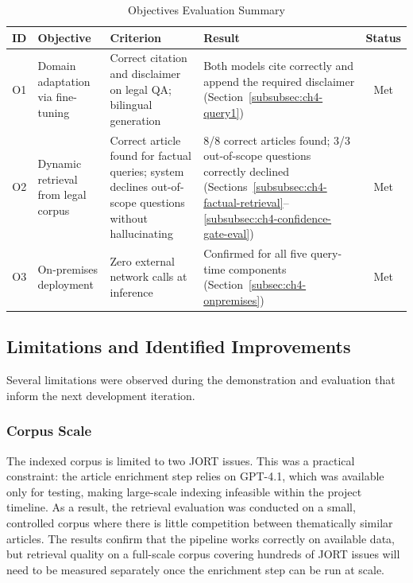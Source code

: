 \begin{table}[H]
\centering
\caption{Objectives Evaluation Summary}
\label{tab:objectives-summary}
\renewcommand{\arraystretch}{1.4}
\begin{tabular}{|c|p{2.8cm}|p{4cm}|p{3.5cm}|c|}
\hline
\textbf{ID} & \textbf{Objective} & \textbf{Criterion} & \textbf{Result} & \textbf{Status} \\
\hline
O1 & Domain adaptation via fine-tuning & Correct citation and disclaimer on legal QA; bilingual generation & Both models cite correctly and append the required disclaimer (Section~\ref{subsubsec:ch4-query1}) & Met \\
\hline
O2 & Dynamic retrieval from legal corpus & Correct article found for factual queries; system declines out-of-scope questions without hallucinating & 8/8 correct articles found; 3/3 out-of-scope questions correctly declined (Sections~\ref{subsubsec:ch4-factual-retrieval}--\ref{subsubsec:ch4-confidence-gate-eval}) & Met \\
\hline
O3 & On-premises deployment & Zero external network calls at inference & Confirmed for all five query-time components (Section~\ref{subsec:ch4-onpremises}) & Met \\
\hline
\end{tabular}
\end{table}

\subsection{Limitations and Identified Improvements}
\label{subsec:ch4-limitations}

Several limitations were observed during the demonstration and evaluation that inform the next development iteration.

\subsubsection{Corpus Scale}

The indexed corpus is limited to two \ac{JORT} issues. This was a practical constraint: the article enrichment step relies on GPT-4.1, which was available only for testing, making large-scale indexing infeasible within the project timeline. As a result, the retrieval evaluation was conducted on a small, controlled corpus where there is little competition between thematically similar articles. The results confirm that the pipeline works correctly on available data, but retrieval quality on a full-scale corpus covering hundreds of \ac{JORT} issues will need to be measured separately once the enrichment step can be run at scale.

